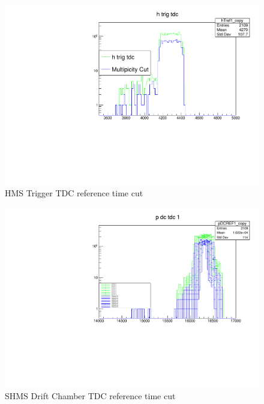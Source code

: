 \documentclass[10pt]{beamer}
\begin{document}
\begin{frame}{}
    \begin{figure}
    \centering
    \includegraphics[width=\textwidth]{h_trig_tdc.pdf}
    \caption{HMS Trigger TDC reference time cut}
\end{figure}{}
\end{frame}{}

\begin{frame}{}
    \begin{figure}
    \centering
    \includegraphics[width=\textwidth]{p_dc_tdc.pdf}
    \caption{SHMS Drift Chamber TDC reference time cut}
\end{figure}{}
\end{frame}{}
\end{document}
